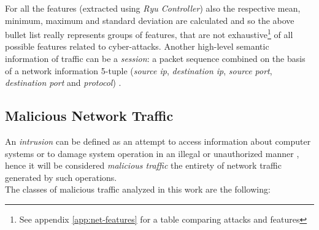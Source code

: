 For all the features (extracted using \textit{Ryu Controller}) also the respective mean, minimum, maximum and standard deviation are calculated and so the above bullet list really represents groups of features, that are not exhaustive\footnote{See appendix \ref{app:net-features} for a table comparing attacks and features} of all possible features related to cyber-attacks. Another high-level semantic information of traffic can be a \textit{session}: a packet sequence combined on the basis of a network information 5-tuple (\textit{source ip}, \textit{destination ip}, \textit{source port}, \textit{destination port} and \textit{protocol}) \cite{Liu2019}.
\textcolor{dimgray}{\lipsum[1-3]}


\subsection{Malicious Network Traffic}
\label{subsec:malicious-traffic}

An \textit{intrusion} can be defined as an attempt to access information about computer systems or to damage system operation in an illegal or unauthorized manner \cite{Liu2019}, hence it will be considered \textit{malicious traffic} the entirety of network traffic generated by such operations. \\
The classes of malicious traffic analyzed in this work are the following:

